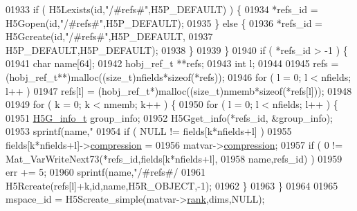 \begin{DoxyCode}
{{{{01933                     \textcolor{keywordflow}{if} ( H5Lexists(\textcolor{keywordtype}{id},\textcolor{stringliteral}{"/#refs#"},H5P\_DEFAULT) ) \{
01934                         *refs\_id = H5Gopen(\textcolor{keywordtype}{id},\textcolor{stringliteral}{"/#refs#"},H5P\_DEFAULT);
01935                     \} \textcolor{keywordflow}{else} \{
01936                         *refs\_id = H5Gcreate(\textcolor{keywordtype}{id},\textcolor{stringliteral}{"/#refs#"},H5P\_DEFAULT,
01937                                              H5P\_DEFAULT,H5P\_DEFAULT);
01938                     \}
01939                 \}
01940                 \textcolor{keywordflow}{if} ( *refs\_id > -1 ) \{
01941                     \textcolor{keywordtype}{char} name[64];
01942                     hobj\_ref\_t **refs;
01943                     \textcolor{keywordtype}{int} l;
01944 
01945                     refs = (hobj\_ref\_t**)malloc((\textcolor{keywordtype}{size\_t})nfields*\textcolor{keyword}{sizeof}(*refs));
01946                     \textcolor{keywordflow}{for} ( l = 0; l < nfields; l++ )
01947                         refs[l] = (hobj\_ref\_t*)malloc((\textcolor{keywordtype}{size\_t})nmemb*\textcolor{keyword}{sizeof}(*refs[l]));
01948 
01949                     \textcolor{keywordflow}{for} ( k = 0; k < nmemb; k++ ) \{
01950                         \textcolor{keywordflow}{for} ( l = 0; l < nfields; l++ ) \{
01951                             \hyperlink{struct_h5_g__info__t}{H5G\_info\_t} group\_info;
01952                             H5Gget\_info(*refs\_id, &group\_info);
01953                             sprintf(name,\textcolor{stringliteral}{"%
01954                             \textcolor{keywordflow}{if} ( NULL != fields[k*nfields+l] )
01955                                 fields[k*nfields+l]->\hyperlink{group___m_a_t_aeef0466048621cb2c959ba7f6c774d06}{compression} =
01956                                     matvar->\hyperlink{group___m_a_t_aeef0466048621cb2c959ba7f6c774d06}{compression};
01957                             \textcolor{keywordflow}{if} ( 0 != Mat\_VarWriteNext73(*refs\_id,fields[k*nfields+l],
01958                                 name,refs\_id) )
01959                                 err += 5;
01960                             sprintf(name,\textcolor{stringliteral}{"/#refs#/%
01961                             H5Rcreate(refs[l]+k,\textcolor{keywordtype}{id},name,H5R\_OBJECT,-1);
01962                         \}
01963                     \}
01964 
01965                     mspace\_id = H5Screate\_simple(matvar->\hyperlink{group___m_a_t_a84ba70c96ded13cc555fa75b768d9921}{rank},dims,NULL);
}}}}}}
\end{DoxyCode}
